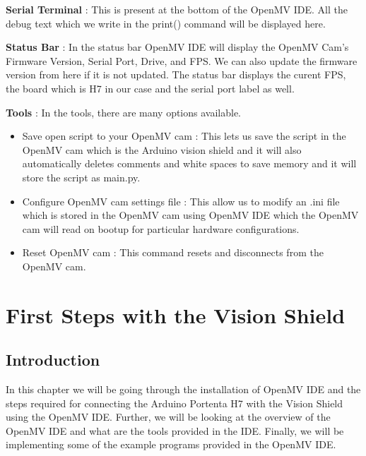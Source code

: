 \textbf{Serial Terminal} :
This is present at the bottom of the OpenMV IDE. All the debug text which we write in the print() command will be displayed here.

\textbf{Status Bar} :
In the status bar OpenMV IDE will display the OpenMV Cam’s Firmware Version, Serial Port, Drive, and FPS. We can also update the firmware version from here if it is not updated. The status bar displays the curent FPS, the board which is H7 in our case and the serial port label as well.

\textbf{Tools} :
In the tools, there are many options available.
\begin{itemize}
    \vspace{-0.6mm}
    \item Save open script to your OpenMV cam : This lets us save the script in the OpenMV cam which is the Arduino vision shield and it will also automatically deletes comments and white spaces to save memory and it will store the script as main.py.
    \vspace{-0.6mm}
    \item Configure OpenMV cam settings file : This allow us to modify an .ini file which is stored in the OpenMV cam using OpenMV IDE which the OpenMV cam will read on bootup for particular hardware configurations.
    \vspace{-0.6mm}
    \item Reset OpenMV cam : This command resets and disconnects from the OpenMV cam.
    \vspace{-0.6mm}
\end{itemize} 






\chapter{First Steps with the Vision Shield}

\section{Introduction}

In this chapter we will be going through the installation of OpenMV IDE and the steps required for connecting the Arduino Portenta H7 with the Vision Shield using the OpenMV IDE. Further, we will be looking at the overview of the OpenMV IDE and what are the tools provided in the IDE.  Finally, we will be implementing some of the example programs provided in the OpenMV IDE.


